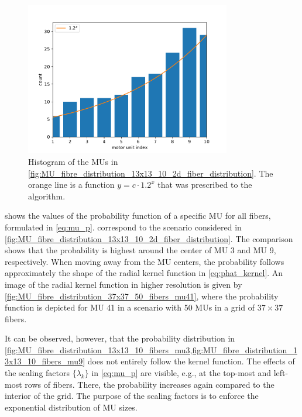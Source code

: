 \begin{figure}%
  \centering%
  \includegraphics[width=0.8\textwidth]{images/motor_unit_assignment/MU_fibre_distribution_13x13_10_fiber_distribution.pdf}%
  \caption{Histogram of the MUs in \cref{fig:MU_fibre_distribution_13x13_10_2d_fiber_distribution}. The orange line is a function $y=c\cdot 1.2^x$ that was prescribed to the algorithm.}%
  \label{fig:MU_fibre_distribution_13x13_10_fiber_distribution}%
\end{figure}

 shows the values of the probability function of a specific MU for all fibers, formulated in \cref{eq:mu_p}.  correspond to the scenario considered in \cref{fig:MU_fibre_distribution_13x13_10_2d_fiber_distribution}. The comparison shows that the probability is highest around the center of MU 3 and MU 9, respectively. When moving away from the MU centers, the probability follows approximately the shape of the radial kernel function in \cref{eq:phat_kernel}.
An image of the radial kernel function in higher resolution is given by \cref{fig:MU_fibre_distribution_37x37_50_fibers_mu41}, where the probability function is depicted for MU 41 in a scenario with 50 MUs in a grid of $37 \times 37$ fibers.

It can be observed, however, that the probability distribution in \cref{fig:MU_fibre_distribution_13x13_10_fibers_mu3,fig:MU_fibre_distribution_13x13_10_fibers_mu9} does not entirely follow the kernel function. The effects of the scaling factors $\{\lambda_k\}$ in \cref{eq:mu_p} are visible, e.g., at the top-most and left-most rows of fibers. There, the probability increases again compared to the interior of the grid. The purpose of the scaling factors is to enforce the exponential distribution of MU sizes.

